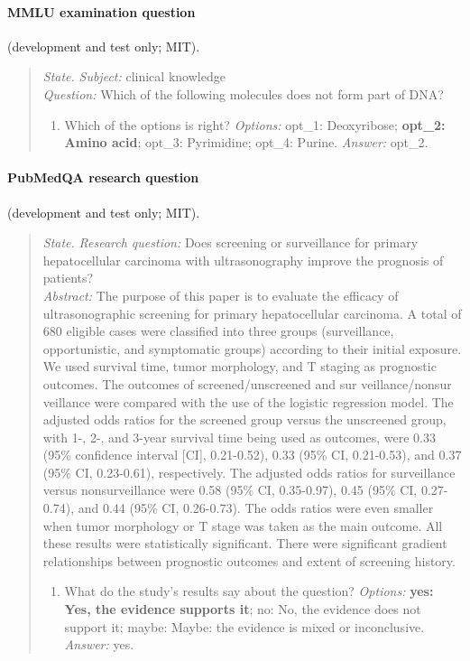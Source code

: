 \paragraph{MMLU examination question} (development and test only; MIT).
\begin{quote}\footnotesize\raggedright
\textit{State.} \textit{Subject:} clinical knowledge\\ \textit{Question:} Which of the following molecules does not form part of DNA?
\begin{enumerate}[label=Q\arabic*.,leftmargin=2.2em,itemsep=1pt,topsep=2pt]
  \item Which of the options is right? \textit{Options:} opt\_\allowbreak{}1: Deoxyribose; \textbf{opt\_\allowbreak{}2: Amino acid}; opt\_\allowbreak{}3: Pyrimidine; opt\_\allowbreak{}4: Purine. \textit{Answer:} opt\_2.
\end{enumerate}
\end{quote}

\paragraph{PubMedQA research question} (development and test only; MIT).
\begin{quote}\footnotesize\raggedright
\textit{State.} \textit{Research question:} Does screening or surveillance for primary hepatocellular carcinoma with ultrasonography improve the prognosis of patients?\\ \textit{Abstract:} The purpose of this paper is to evaluate the efficacy of ultrasonographic screening for primary hepatocellular carcinoma. A total of 680 eligible cases were classified into three groups (surveillance, opportunistic, and symptomatic groups) according to their initial exposure. We used survival time, tumor morphology, and T staging as prognostic outcomes. The outcomes of screened/unscreened and sur veillance/nonsur veillance were compared with the use of the logistic regression model. The adjusted odds ratios for the screened group versus the unscreened group, with 1-, 2-, and 3-year survival time being used as outcomes, were 0.33 (95\% confidence interval [CI], 0.21-0.52), 0.33 (95\% CI, 0.21-0.53), and 0.37 (95\% CI, 0.23-0.61), respectively. The adjusted odds ratios for surveillance versus nonsurveillance were 0.58 (95\% CI, 0.35-0.97), 0.45 (95\% CI, 0.27-0.74), and 0.44 (95\% CI, 0.26-0.73). The odds ratios were even smaller when tumor morphology or T stage was taken as the main outcome. All these results were statistically significant. There were significant gradient relationships between prognostic outcomes and extent of screening history.
\begin{enumerate}[label=Q\arabic*.,leftmargin=2.2em,itemsep=1pt,topsep=2pt]
  \item What do the study's results say about the question? \textit{Options:} \textbf{yes: Yes, the evidence supports it}; no: No, the evidence does not support it; maybe: Maybe: the evidence is mixed or inconclusive. \textit{Answer:} yes.
\end{enumerate}
\end{quote}

